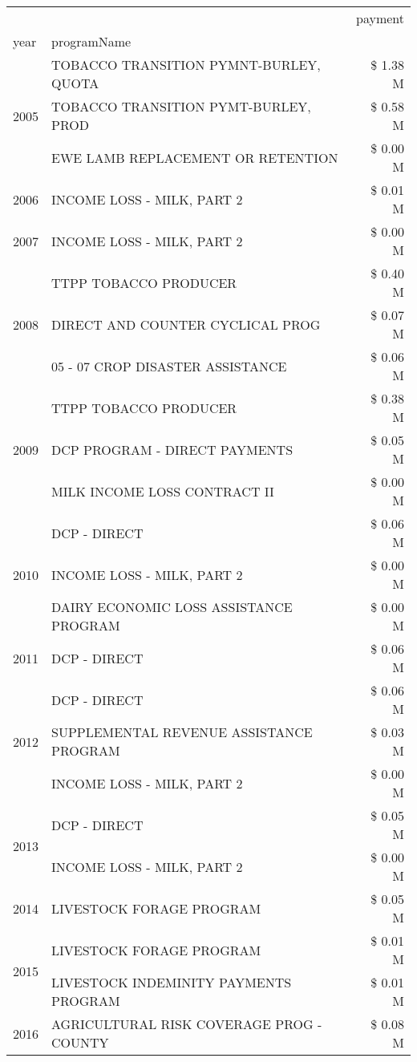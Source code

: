 \begin{tabular}{llr}
\toprule
 &  & payment \\
year & programName &  \\
\midrule
\multirow[t]{3}{*}{2005} & TOBACCO TRANSITION PYMNT-BURLEY, QUOTA & \$ 1.38 M \\
 & TOBACCO TRANSITION PYMT-BURLEY, PROD & \$ 0.58 M \\
 & EWE LAMB REPLACEMENT OR RETENTION & \$ 0.00 M \\
\cline{1-3}
2006 & INCOME LOSS - MILK, PART 2 & \$ 0.01 M \\
\cline{1-3}
2007 & INCOME LOSS - MILK, PART 2 & \$ 0.00 M \\
\cline{1-3}
\multirow[t]{3}{*}{2008} & TTPP TOBACCO PRODUCER & \$ 0.40 M \\
 & DIRECT AND COUNTER CYCLICAL PROG & \$ 0.07 M \\
 & 05 - 07 CROP DISASTER ASSISTANCE & \$ 0.06 M \\
\cline{1-3}
\multirow[t]{3}{*}{2009} & TTPP TOBACCO PRODUCER & \$ 0.38 M \\
 & DCP PROGRAM - DIRECT PAYMENTS & \$ 0.05 M \\
 & MILK INCOME LOSS CONTRACT II & \$ 0.00 M \\
\cline{1-3}
\multirow[t]{3}{*}{2010} & DCP - DIRECT & \$ 0.06 M \\
 & INCOME LOSS - MILK, PART 2 & \$ 0.00 M \\
 & DAIRY ECONOMIC LOSS ASSISTANCE PROGRAM & \$ 0.00 M \\
\cline{1-3}
2011 & DCP - DIRECT & \$ 0.06 M \\
\cline{1-3}
\multirow[t]{3}{*}{2012} & DCP - DIRECT & \$ 0.06 M \\
 & SUPPLEMENTAL REVENUE ASSISTANCE PROGRAM & \$ 0.03 M \\
 & INCOME LOSS - MILK, PART 2 & \$ 0.00 M \\
\cline{1-3}
\multirow[t]{2}{*}{2013} & DCP - DIRECT & \$ 0.05 M \\
 & INCOME LOSS - MILK, PART 2 & \$ 0.00 M \\
\cline{1-3}
2014 & LIVESTOCK FORAGE PROGRAM & \$ 0.05 M \\
\cline{1-3}
\multirow[t]{2}{*}{2015} & LIVESTOCK FORAGE PROGRAM & \$ 0.01 M \\
 & LIVESTOCK INDEMINITY PAYMENTS PROGRAM & \$ 0.01 M \\
\cline{1-3}
\multirow[t]{3}{*}{2016} & AGRICULTURAL RISK COVERAGE PROG - COUNTY & \$ 0.08 M \\

\end{tabular}
